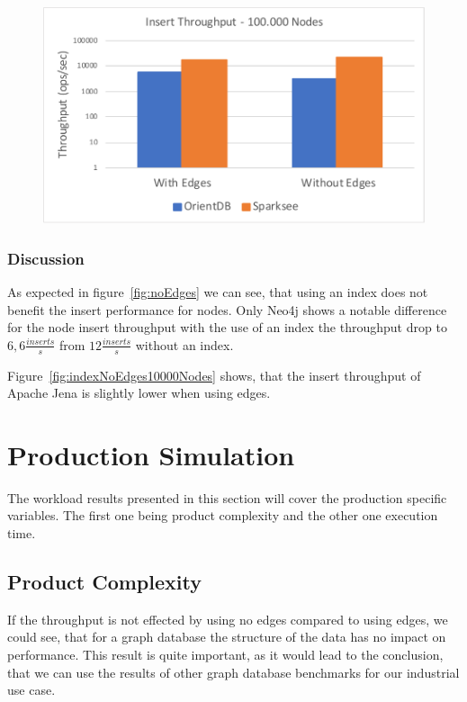 \begin{figure}[h!]
  \centering
  \includegraphics[width=.75\textwidth]{images/throughput/indexNoEdges100000Nodes}
  \label{fig:indexNoEdges100000Nodes}
\end{figure}

\subsubsection{Discussion}
As expected in figure~\ref{fig:noEdges} we can see,
that using an index does not benefit the insert performance for nodes.
Only Neo4j shows a notable difference for the node insert throughput with the use of an index the throughput drop to $ 6,6 \frac{inserts}{s} $ from $ 12 \frac{inserts}{s} $ without an index.

Figure~\ref{fig:indexNoEdges10000Nodes} shows,
that the insert throughput of Apache Jena is slightly lower when using edges.

\section{Production Simulation}
\label{ch:evaluation:se:productionSimulation}
The workload results presented in this section will cover the production specific variables.
The first one being product complexity and the other one execution time.

\subsection{Product Complexity}
\label{ch:evaluation:se:productComplexity}
If the throughput is not effected by using no edges compared to using edges,
we could see,
that for a graph database the structure of the data has no impact on performance.
This result is quite important,
as it would lead to the conclusion,
that we can use the results of other graph database benchmarks for our industrial use case.

